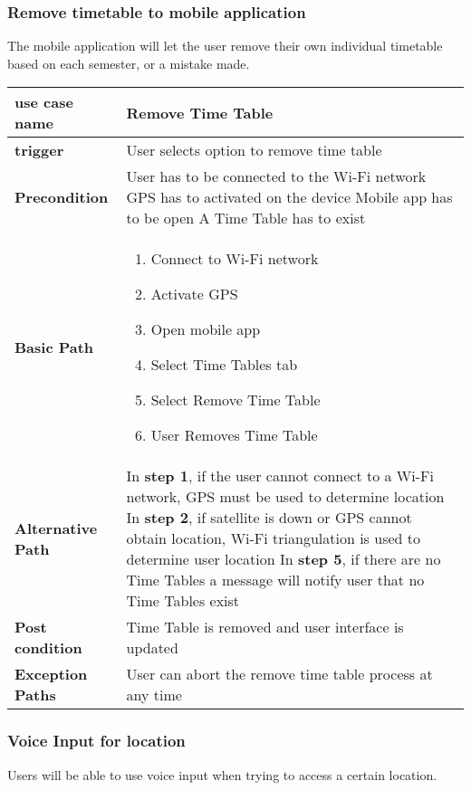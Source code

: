 \documentclass{article}
\begin{document}
\begin{center}
\subsubsection{Remove timetable to mobile application}
The mobile application will let the user remove their own individual timetable based on each semester, or a mistake made.
\begin{tabu} to 0.8\textwidth { | X[l] | X[c]| }
 \hline

\textbf{use case name} & Remove Time Table \\
 \hline
\textbf{trigger} & User selects option to remove time table    \\
 \hline
\textbf{Precondition} & User has to be connected to the Wi-Fi network
GPS has to activated on the device
Mobile app has to be open
A Time Table has to exist

    \\
\hline
\textbf{Basic Path} & 
\begin{enumerate}
  \item Connect to Wi-Fi network
  \item Activate GPS
  \item Open mobile app
  \item Select Time Tables tab
  \item Select Remove Time Table
  \item User Removes Time Table
\end{enumerate}  \\
\hline
\textbf{Alternative Path} & In\textbf{ step 1}, if the user cannot connect to a Wi-Fi network, GPS must be used to determine location
  \newline In \textbf{step 2}, if satellite is down or GPS cannot obtain location, Wi-Fi triangulation is used to determine user location
 \newline  In \textbf{step 5}, if there are no Time Tables a message will notify user that no Time Tables exist

 \\
\hline
\textbf{Post condition} & Time Table is removed and user interface is updated   \\
\hline
\textbf{Exception Paths} & User can abort the remove time table process at any time    \\
\hline
\end{tabu}
\newpage
\subsubsection{Voice Input for location}
Users will be able to use voice input when trying to access a certain location.
\begin{tabu} to 0.8\textwidth { | X[l] | X[c]| }
 \hline


\end{tabu}
\end{center}
\end{document}
